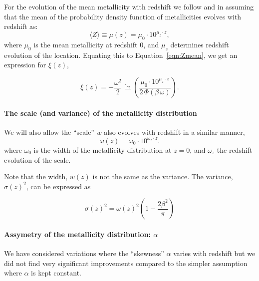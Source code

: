 \documentclass[twocolumn]{aastex631}
\begin{document}
\noindent For the evolution of the mean metallicity with redshift we follow \cite{Neijssel+2019} and \cite{Langer2006} in assuming that the mean of the probability density function of metallicities evolves with redshift as:
\begin{equation}
\label{eq: mean Z}
    \langle Z \rangle \equiv \mu(z) = \mu_0 \cdot 10^{\mu_z \cdot z},
\end{equation}
where $\mu_0
$ is the mean metallicity at redshift 0, and $\mu_z
$ determines redshift evolution of the location. Equating this to Equation~\ref{eqn:Zmean}, we get an expression for $\xi(z)$,

\begin{equation}
\label{eq mu z}
    \xi(z) = -\frac{\omega^2}{2}\, \ln\left(\frac{  \mu_0 \cdot 10^{\mu_z \cdot z} }{2\, \Phi(\beta\, \omega)}  \right).
\end{equation}

\paragraph{The scale (and variance) of the metallicity distribution}

We will also allow the ``scale'' $w$ also evolves with redshift in a similar manner, 
\begin{equation}
\label{eq: sigma z}
    \omega(z) = \omega_0 \cdot 10^{\omega_z \cdot z}.
\end{equation}
where $\omega_0$ is
the width of the metallicity distribution at $z=0$, and $\omega_z$
the redshift evolution of the scale.

Note that the width, $w(z)$ is not the same as the variance. The variance, $\sigma(z)^2$, can be expressed as

\begin{equation}
    \sigma(z)^2 = \omega(z)^2 \left( 1 - \frac{2\beta^2}{\pi} \right)
\end{equation}

\paragraph{Assymetry of the metallicity distribution: $\alpha$}
We have considered variations where the ``skewness'' $\alpha$ varies with redshift but we did not find very significant improvements compared to the simpler assumption where $\alpha$ is kept constant. 


\end{document}
